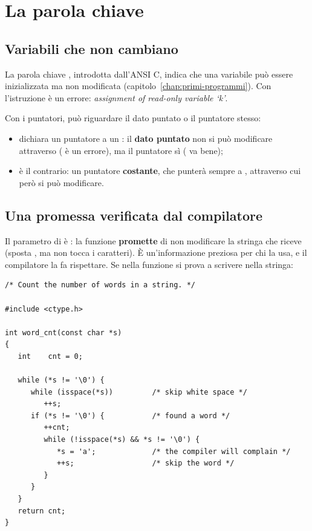 \section{La parola chiave }

\subsection{Variabili che non cambiano}

La parola chiave , introdotta dall'ANSI C, indica che una
variabile può essere inizializzata ma non modificata
(capitolo~\ref{chap:primi-programmi}). Con 
l'istruzione  è un errore: \textit{assignment of read-only
variable ‘k’}.

Con i puntatori,  può riguardare il dato puntato o il puntatore
stesso:

\begin{itemize}
  \item {} dichiara un puntatore a un :
        il \textbf{dato puntato} non si può modificare attraverso 
        ( è un errore), ma il puntatore sì ( va
        bene);
  \item {} è il contrario: un puntatore
        \textbf{costante}, che punterà sempre a , attraverso cui
        però  si può modificare.
\end{itemize}

\subsection{Una promessa verificata dal compilatore}

Il parametro di  è : la funzione
\textbf{promette} di non modificare la stringa che riceve (sposta ,
ma non tocca i caratteri). È un'informazione preziosa per chi la usa, e il
compilatore la fa rispettare. Se nella funzione si prova a scrivere nella
stringa:

\begin{lstlisting}[style=c, name=word_cnt2.c]
/* Count the number of words in a string. */

#include <ctype.h>

int word_cnt(const char *s)
{
   int    cnt = 0;

   while (*s != '\0') {
      while (isspace(*s))         /* skip white space */
         ++s;
      if (*s != '\0') {           /* found a word */
         ++cnt;
         while (!isspace(*s) && *s != '\0') {
            *s = 'a';             /* the compiler will complain */
            ++s;                  /* skip the word */
         }
      }
   }
   return cnt;
}
\end{lstlisting}

